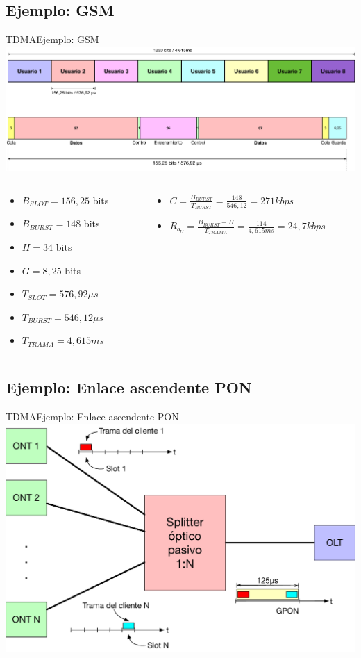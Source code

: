 \documentclass[10pt,compress]{beamer} %
\begin{document}
\subsection{Ejemplo: GSM}
\begin{frame}{TDMA}{Ejemplo: GSM}
  \centering \includegraphics[width=0.7\linewidth]{Figuras/TramaGSM2.pdf}
  \begin{columns}[onlytextwidth]
    \begin{column}{.4\textwidth}
  \begin{itemize}
    \item $B_{SLOT} = 156,25$ bits
    \item $B_{BURST} = 148$ bits
    \item $H = 34$ bits
    \item $G = 8,25$ bits
    \item $T_{SLOT} = 576,92 \mu s$
    \item $T_{BURST} = 546,12 \mu s$
    \item $T_{TRAMA} = 4,615 ms$
  \end{itemize}
\end{column}
  \begin{column}{.6\textwidth}
    \begin{itemize}
      \item $C = \frac{B_{BURST}}{T_{BURST}} = \frac{148}{546,12} = 271 kbps$
      \item $R_{b_U} = \frac{B_{BURST}-H}{T_{TRAMA}} = \frac{114}{4,615 ms} = 24,7 kbps$
    \end{itemize}
  \end{column}
\end{columns}
\end{frame}


\subsection{Ejemplo: Enlace ascendente PON}
\begin{frame}{TDMA}{Ejemplo: Enlace ascendente PON}
  \centering \includegraphics[width=0.8\linewidth]{Figuras/TDMA_PON.pdf}
\end{frame}
\end{document}
